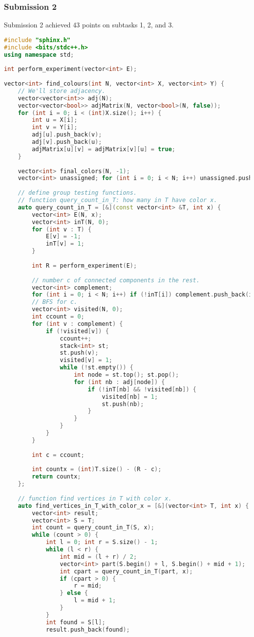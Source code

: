 \subsubsection{Submission 2}
Submission 2 achieved 43 points on subtasks 1, 2, and 3.
\begin{lstlisting}[language=C++]
#include "sphinx.h"
#include <bits/stdc++.h>
using namespace std;
 
int perform_experiment(vector<int> E);
 
vector<int> find_colours(int N, vector<int> X, vector<int> Y) {
    // We'll store adjacency.
    vector<vector<int>> adj(N);
    vector<vector<bool>> adjMatrix(N, vector<bool>(N, false));
    for (int i = 0; i < (int)X.size(); i++) {
        int u = X[i];
        int v = Y[i];
        adj[u].push_back(v);
        adj[v].push_back(u);
        adjMatrix[u][v] = adjMatrix[v][u] = true;
    }
 
    vector<int> final_colors(N, -1);
    vector<int> unassigned; for (int i = 0; i < N; i++) unassigned.push_back(i);
 
    // define group testing functions.
    // function query_count_in_T: how many in T have color x.
    auto query_count_in_T = [&](const vector<int> &T, int x) {
        vector<int> E(N, x);
        vector<int> inT(N, 0);
        for (int v : T) {
            E[v] = -1;
            inT[v] = 1;
        }
 
        int R = perform_experiment(E);
 
        // number c of connected components in the rest.
        vector<int> complement;
        for (int i = 0; i < N; i++) if (!inT[i]) complement.push_back(i);
        // BFS for c.
        vector<int> visited(N, 0);
        int ccount = 0;
        for (int v : complement) {
            if (!visited[v]) {
                ccount++;
                stack<int> st;
                st.push(v);
                visited[v] = 1;
                while (!st.empty()) {
                    int node = st.top(); st.pop();
                    for (int nb : adj[node]) {
                        if (!inT[nb] && !visited[nb]) {
                            visited[nb] = 1;
                            st.push(nb);
                        }
                    }
                }
            }
        }
 
        int c = ccount;
 
        int countx = (int)T.size() - (R - c);
        return countx;
    };
 
    // function find vertices in T with color x.
    auto find_vertices_in_T_with_color_x = [&](vector<int> T, int x) {
        vector<int> result;
        vector<int> S = T;
        int count = query_count_in_T(S, x);
        while (count > 0) {
            int l = 0; int r = S.size() - 1;
            while (l < r) {
                int mid = (l + r) / 2;
                vector<int> part(S.begin() + l, S.begin() + mid + 1);
                int cpart = query_count_in_T(part, x);
                if (cpart > 0) {
                    r = mid;
                } else {
                    l = mid + 1;
                }
            }
            int found = S[l];
            result.push_back(found);
 

\end{lstlisting}

